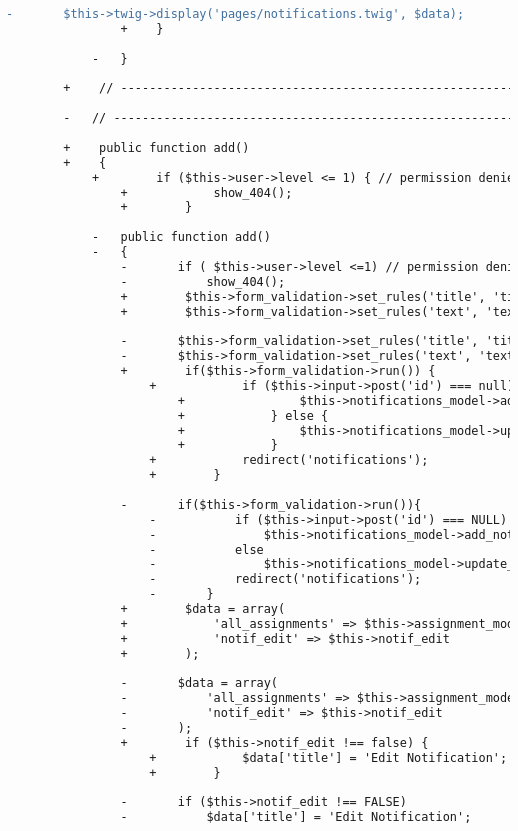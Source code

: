 \begin{lstlisting}[language=diff, caption=Perubahan pada kode Notifications.php]
				-		$this->twig->display('pages/notifications.twig', $data);
				+    }
			
			-	}
		
		+    // ------------------------------------------------------------------------
		
		-	// ------------------------------------------------------------------------
		
		+    public function add()
		+    {
			+        if ($this->user->level <= 1) { // permission denied
				+            show_404();
				+        }
			
			-	public function add()
			-	{
				-		if ( $this->user->level <=1) // permission denied
				-			show_404();
				+        $this->form_validation->set_rules('title', 'title', 'trim');
				+        $this->form_validation->set_rules('text', 'text', ''); /* todo: xss clean */
				
				-		$this->form_validation->set_rules('title', 'title', 'trim');
				-		$this->form_validation->set_rules('text', 'text', ''); /* todo: xss clean */
				+        if($this->form_validation->run()) {
					+            if ($this->input->post('id') === null) {
						+                $this->notifications_model->add_notification($this->input->post('title'), $this->input->post('text'));
						+            } else {
						+                $this->notifications_model->update_notification($this->input->post('id'), $this->input->post('title'), $this->input->post('text'));
						+            }
					+            redirect('notifications');
					+        }
				
				-		if($this->form_validation->run()){
					-			if ($this->input->post('id') === NULL)
					-				$this->notifications_model->add_notification($this->input->post('title'), $this->input->post('text'));
					-			else
					-				$this->notifications_model->update_notification($this->input->post('id'), $this->input->post('title'), $this->input->post('text'));
					-			redirect('notifications');
					-		}
				+        $data = array(
				+            'all_assignments' => $this->assignment_model->all_assignments(),
				+            'notif_edit' => $this->notif_edit
				+        );
				
				-		$data = array(
				-			'all_assignments' => $this->assignment_model->all_assignments(),
				-			'notif_edit' => $this->notif_edit
				-		);
				+        if ($this->notif_edit !== false) {
					+            $data['title'] = 'Edit Notification';
					+        }
				
				-		if ($this->notif_edit !== FALSE)
				-			$data['title'] = 'Edit Notification';
				

\end{lstlisting}
